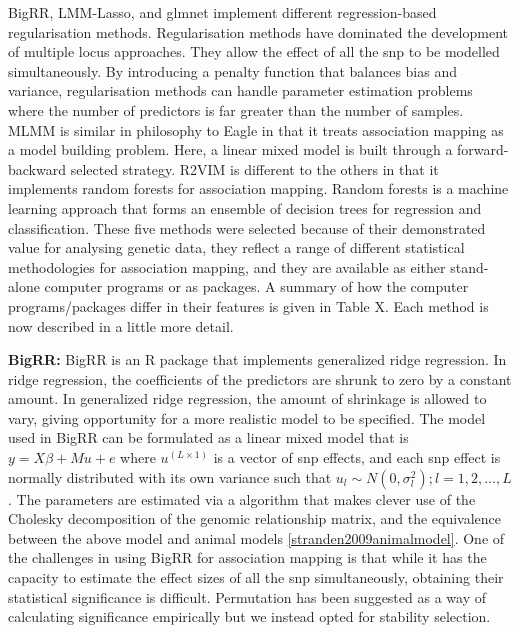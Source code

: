 \documentclass{nature}
\begin{document}
BigRR, LMM-Lasso, and glmnet  implement different regression-based regularisation methods. Regularisation methods have dominated 
the development of multiple locus approaches.  They allow the effect of all the snp to be modelled simultaneously. 
By introducing a penalty function that balances bias and variance, regularisation methods can 
handle parameter estimation problems where the number of predictors is far greater than the number of samples.  
MLMM is similar in philosophy to Eagle in that it treats association mapping as a model building problem. Here, a linear mixed 
model is built through a forward-backward selected strategy.  
R2VIM is different to the others in that it implements 
random forests for association mapping. 
Random forests is a machine learning approach that forms an ensemble of decision trees for regression and 
classification. 
These five methods were selected because of their demonstrated value 
for analysing genetic data, they reflect a range of different statistical methodologies for association mapping, and they are available as 
either stand-alone computer programs or as  packages. A summary of how the computer programs/packages differ in their 
features is given in Table X. Each method is now described in a little more detail. 



\textbf{BigRR:} BigRR \cite{shen2013novel}  is an R package that implements generalized ridge regression.
In ridge regression, the coefficients of the predictors are shrunk 
to zero by a constant amount.  In generalized ridge regression, the amount of shrinkage is allowed to vary, giving opportunity for 
a more realistic model to be specified. The model used in BigRR can be formulated as a linear mixed model that is 
$y = X \beta + M u + e$ where $u^{(L \times 1)}$ is a vector of snp effects, and each snp 
effect is normally distributed with its own variance such that $u_l \sim N(0, \sigma^2_l); l=1,2, \ldots, L$. 
The parameters are estimated via a 
algorithm that makes clever use of the Cholesky decomposition of the genomic relationship matrix, 
and the equivalence between the above model and animal models \ref{stranden2009animalmodel}. 
One of the challenges in using BigRR for association mapping is that while it has the capacity to estimate the effect sizes of all the snp simultaneously, 
obtaining their statistical significance is difficult. 
Permutation has been suggested as a way of calculating significance 
empirically \cite{shen2013novel} but we instead opted for stability selection.
\end{document}
